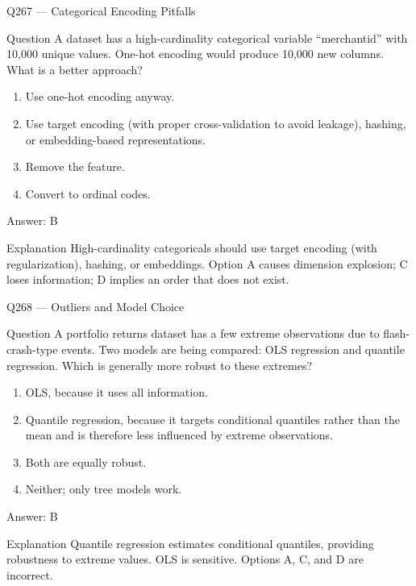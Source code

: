 \documentclass[aspectratio=169,8pt]{beamer}
\begin{document}
\begin{frame}{Q267 --- Categorical Encoding Pitfalls}
\begin{block}{Question}
A dataset has a high-cardinality categorical variable ``merchantid'' with 10,000 unique values. One-hot encoding would produce 10,000 new columns. What is a better approach?
\begin{enumerate}
\item Use one-hot encoding anyway.
\item Use target encoding (with proper cross-validation to avoid leakage), hashing, or embedding-based representations.
\item Remove the feature.
\item Convert to ordinal codes.
\end{enumerate} \end{block}
\begin{exampleblock}{Answer: B}\end{exampleblock}
\begin{block}{Explanation}
High-cardinality categoricals should use target encoding (with regularization), hashing, or embeddings. Option A causes dimension explosion; C loses information; D implies an order that does not exist.
\end{block}
\end{frame}

\begin{frame}{Q268 --- Outliers and Model Choice}
\begin{block}{Question}
A portfolio returns dataset has a few extreme observations due to flash-crash-type events. Two models are being compared: OLS regression and quantile regression. Which is generally more robust to these extremes?
\begin{enumerate} 
\item OLS, because it uses all information.
\item Quantile regression, because it targets conditional quantiles rather than the mean and is therefore less influenced by extreme observations.
\item Both are equally robust.
\item Neither; only tree models work.
\end{enumerate} \end{block}
\begin{exampleblock}{Answer: B}\end{exampleblock}
\begin{block}{Explanation}
Quantile regression estimates conditional quantiles, providing robustness to extreme values. OLS is sensitive. Options A, C, and D are incorrect.
\end{block}
\end{frame}
\end{document}
